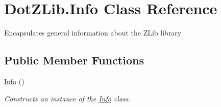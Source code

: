 \hypertarget{class_dot_z_lib_1_1_info}{\section{Dot\+Z\+Lib.\+Info Class Reference}
\label{class_dot_z_lib_1_1_info}
}


Encapsulates general information about the Z\+Lib library  


\subsection*{Public Member Functions}
\begin{DoxyCompactItemize}
\item 
\hyperlink{class_dot_z_lib_1_1_info_a48b690fe56ca7cc8e8a40a740476696b}{Info} ()
\begin{DoxyCompactList}\small\item\em Constructs an instance of the {\ttfamily \hyperlink{class_dot_z_lib_1_1_info}{Info}} class. \end{DoxyCompactList}\end{DoxyCompactItemize}
